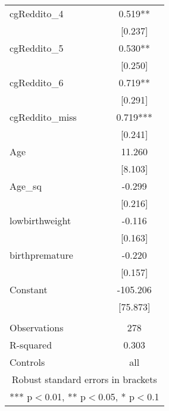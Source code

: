 \documentclass[]{article}
\begin{document}
\begin{tabular}{lc}
cgReddito\_4 & 0.519** \\
 & [0.237] \\
cgReddito\_5 & 0.530** \\
 & [0.250] \\
cgReddito\_6 & 0.719** \\
 & [0.291] \\
cgReddito\_miss & 0.719*** \\
 & [0.241] \\
Age & 11.260 \\
 & [8.103] \\
Age\_sq & -0.299 \\
 & [0.216] \\
lowbirthweight & -0.116 \\
 & [0.163] \\
birthpremature & -0.220 \\
 & [0.157] \\
Constant & -105.206 \\
 & [75.873] \\
 &  \\
Observations & 278 \\
R-squared & 0.303 \\
 Controls & all \\ \hline
\multicolumn{2}{c}{ Robust standard errors in brackets} \\
\multicolumn{2}{c}{ *** p$<$0.01, ** p$<$0.05, * p$<$0.1} \\
\end{tabular}
\end{document}
